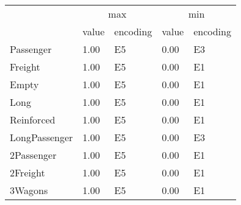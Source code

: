 \begin{tabular}{lllll}
\toprule
 & \multicolumn{2}{c}{max} & \multicolumn{2}{c}{min} \\
 & value & encoding & value & encoding \\
\midrule
Passenger & 1.00 & E5 & 0.00 & E3 \\
Freight & 1.00 & E5 & 0.00 & E1 \\
Empty & 1.00 & E5 & 0.00 & E1 \\
Long & 1.00 & E5 & 0.00 & E1 \\
Reinforced & 1.00 & E5 & 0.00 & E1 \\
LongPassenger & 1.00 & E5 & 0.00 & E3 \\
2Passenger & 1.00 & E5 & 0.00 & E1 \\
2Freight & 1.00 & E5 & 0.00 & E1 \\
3Wagons & 1.00 & E5 & 0.00 & E1 \\
\bottomrule
\end{tabular}
